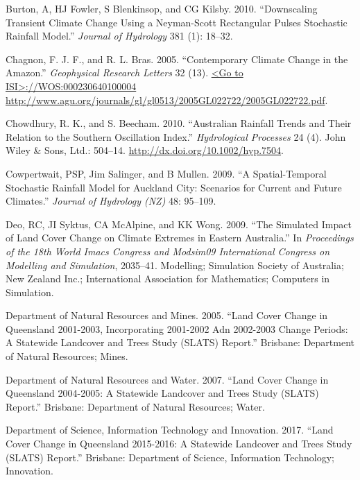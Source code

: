\documentclass[fleqn,10pt,lineno]{wlpeerj} %
\begin{document}
\hypertarget{ref-Burton2010}{}
Burton, A, HJ Fowler, S Blenkinsop, and CG Kilsby. 2010. ``Downscaling
Transient Climate Change Using a Neyman-Scott Rectangular Pulses
Stochastic Rainfall Model.'' \emph{Journal of Hydrology} 381 (1):
18--32.

\hypertarget{ref-Chagnon2005}{}
Chagnon, F. J. F., and R. L. Bras. 2005. ``Contemporary Climate Change
in the Amazon.'' \emph{Geophysical Research Letters} 32 (13).
\href{\%3CGo\%20to\%20ISI\%3E://WOS:000230640100004\%20http://www.agu.org/journals/gl/gl0513/2005GL022722/2005GL022722.pdf}{\textless{}Go to ISI\textgreater{}://WOS:000230640100004 http://www.agu.org/journals/gl/gl0513/2005GL022722/2005GL022722.pdf}.

\hypertarget{ref-Chowdhury2010}{}
Chowdhury, R. K., and S. Beecham. 2010. ``Australian Rainfall Trends and
Their Relation to the Southern Oscillation Index.'' \emph{Hydrological
Processes} 24 (4). John Wiley \& Sons, Ltd.: 504--14.
\url{http://dx.doi.org/10.1002/hyp.7504}.

\hypertarget{ref-Cowpertwait2009}{}
Cowpertwait, PSP, Jim Salinger, and B Mullen. 2009. ``A Spatial-Temporal
Stochastic Rainfall Model for Auckland City: Scenarios for Current and
Future Climates.'' \emph{Journal of Hydrology (NZ)} 48: 95--109.

\hypertarget{ref-Deo2009}{}
Deo, RC, JI Syktus, CA McAlpine, and KK Wong. 2009. ``The Simulated
Impact of Land Cover Change on Climate Extremes in Eastern Australia.''
In \emph{Proceedings of the 18th World Imacs Congress and Modsim09
International Congress on Modelling and Simulation}, 2035--41.
Modelling; Simulation Society of Australia; New Zealand Inc.;
International Association for Mathematics; Computers in Simulation.

\hypertarget{ref-SLATS2001}{}
Department of Natural Resources and Mines. 2005. ``Land Cover Change in
Queensland 2001-2003, Incorporating 2001-2002 Adn 2002-2003 Change
Periods: A Statewide Landcover and Trees Study (SLATS) Report.''
Brisbane: Department of Natural Resources; Mines.

\hypertarget{ref-SLATS2004}{}
Department of Natural Resources and Water. 2007. ``Land Cover Change in
Queensland 2004-2005: A Statewide Landcover and Trees Study (SLATS)
Report.'' Brisbane: Department of Natural Resources; Water.

\hypertarget{ref-SLATS2017}{}
Department of Science, Information Technology and Innovation. 2017.
``Land Cover Change in Queensland 2015-2016: A Statewide Landcover and
Trees Study (SLATS) Report.'' Brisbane: Department of Science,
Information Technology; Innovation.
\end{document}

